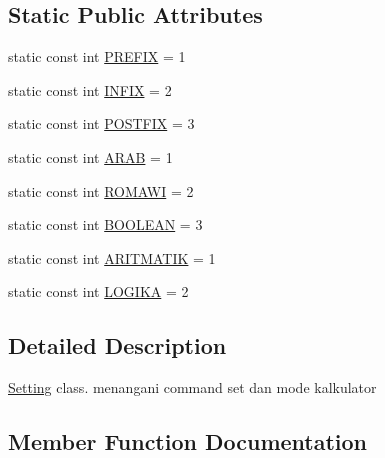 \subsection*{Static Public Attributes}
\begin{DoxyCompactItemize}
\item 
static const int \hyperlink{class_setting_aa7284982909e57a05a7c0f8a3f19c5f4}{P\+R\+E\+F\+I\+X} = 1
\item 
static const int \hyperlink{class_setting_afb7ad1019382068120bcc6b0726e4cf7}{I\+N\+F\+I\+X} = 2
\item 
static const int \hyperlink{class_setting_a16ec949916d2e90e56d68e039eaac356}{P\+O\+S\+T\+F\+I\+X} = 3
\item 
static const int \hyperlink{class_setting_a11455d898348b01ebe6d156e157af5b1}{A\+R\+A\+B} = 1
\item 
static const int \hyperlink{class_setting_abac30ca862140b74bd188c8b3da16a02}{R\+O\+M\+A\+W\+I} = 2
\item 
static const int \hyperlink{class_setting_a268ad37e785a08a88b2fc05fdf9a3033}{B\+O\+O\+L\+E\+A\+N} = 3
\item 
static const int \hyperlink{class_setting_afcddeacd578cc69a5f5b790cfa5c187e}{A\+R\+I\+T\+M\+A\+T\+I\+K} = 1
\item 
static const int \hyperlink{class_setting_aa034225cee86523b7d4ebd13f329150f}{L\+O\+G\+I\+K\+A} = 2
\end{DoxyCompactItemize}


\subsection{Detailed Description}
\hyperlink{class_setting}{Setting} class. menangani command set dan mode kalkulator 

\subsection{Member Function Documentation}
\hypertarget{class_setting_af7686c86a0e69fa4db37352a76b04c6a}{}
